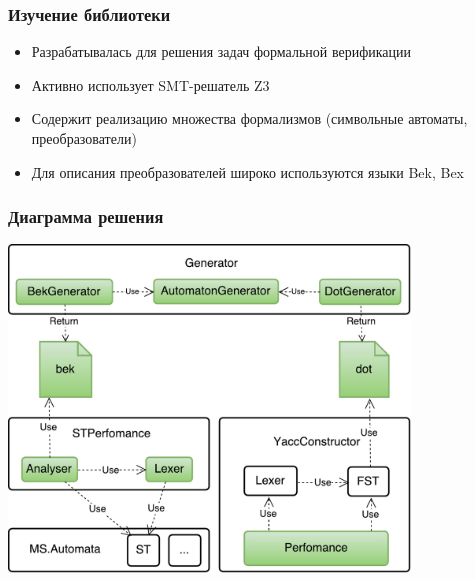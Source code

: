 \documentclass{beamer}
\begin{document}
\begin{frame}
  \transwipe[direction=90]
  \frametitle{Изучение библиотеки}
  \begin{itemize}
    \item Разрабатывалась для решения задач формальной верификации 
    \item Активно использует SMT-решатель Z3
    \item Содержит реализацию множества формализмов (символьные автоматы, преобразователи)
    \item Для описания преобразователей широко используются языки Bek, Bex
  \end{itemize}
\end{frame}

\begin{frame}
  \transwipe[direction=90]
  \frametitle{Диаграмма решения}
  \begin{center}
  \includegraphics[width=0.8\textwidth]{../pictures/YC.pdf}
  \end{center}
\end{frame}
\end{document}
